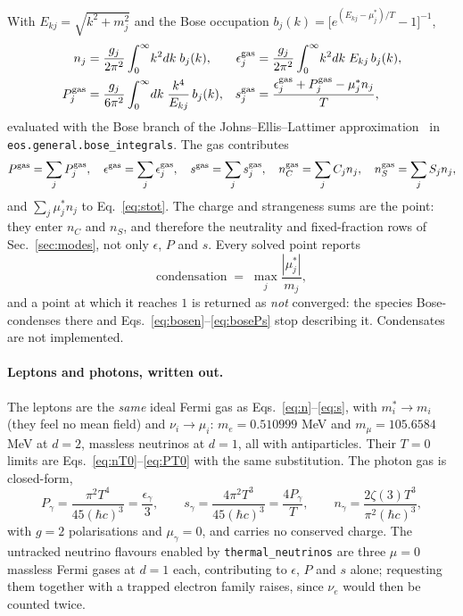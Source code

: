 \documentclass[aps,prc,onecolumn,superscriptaddress,nofootinbib,10pt]{revtex4-2}
\newcommand{\nC}{n_C}
\newcommand{\nS}{n_S}
\newcommand{\meff}[1]{m^{*}_{#1}}
\begin{document}
With $E_{kj} = \sqrt{k^2 + m_j^2}$ and the Bose occupation
$b_j(k) = \big[e^{(E_{kj} - \mu^*_j)/T} - 1\big]^{-1}$,
\begin{align}
  n_j &= \frac{g_j}{2\pi^2}\int_0^\infty \! k^2 dk\; b_j(k) ,
  &
  \epsilon^{\rm gas}_j &= \frac{g_j}{2\pi^2}\int_0^\infty \! k^2 dk\;
                          E_{kj}\, b_j(k) ,
  \label{eq:bosen} \\
  P^{\rm gas}_j &= \frac{g_j}{6\pi^2}\int_0^\infty \! dk\;
                   \frac{k^4}{E_{kj}}\, b_j(k) ,
  &
  s^{\rm gas}_j &= \frac{\epsilon^{\rm gas}_j + P^{\rm gas}_j
                          - \mu^*_j n_j}{T} ,
  \label{eq:bosePs}
\end{align}
evaluated with the Bose branch of the Johns--Ellis--Lattimer
approximation~\cite{JohnsEllisLattimer1996} in
\texttt{eos.general.bose\_integrals}. The gas contributes
\begin{equation}
  P^{\rm gas} = \sum_j P^{\rm gas}_j , \quad
  \epsilon^{\rm gas} = \sum_j \epsilon^{\rm gas}_j , \quad
  s^{\rm gas} = \sum_j s^{\rm gas}_j , \quad
  n_C^{\rm gas} = \sum_j C_j n_j , \quad
  n_S^{\rm gas} = \sum_j S_j n_j ,
\end{equation}
and $\sum_j \mu^*_j n_j$ to Eq.~\eqref{eq:stot}. The charge and strangeness
sums are the point: they enter $\nC$ and $\nS$, and therefore the neutrality
and fixed-fraction rows of Sec.~\ref{sec:modes}, not only $\epsilon$, $P$ and
$s$. Every solved point reports
\begin{equation}
  \text{condensation} \;=\; \max_j \frac{|\mu^*_j|}{m_j} ,
\end{equation}
and a point at which it reaches $1$ is returned as \emph{not} converged:
the species Bose-condenses there and Eqs.~\eqref{eq:bosen}--\eqref{eq:bosePs}
stop describing it. Condensates are not implemented.

\paragraph{Leptons and photons, written out.} The leptons are the \emph{same}
ideal Fermi gas as Eqs.~\eqref{eq:n}--\eqref{eq:s}, with $\meff{i} \to m_i$
(they feel no mean field) and $\nu_i \to \mu_i$: $m_e = 0.510999$ MeV and
$m_\mu = 105.6584$ MeV at $d = 2$, massless neutrinos at $d = 1$, all with
antiparticles. Their $T = 0$ limits are Eqs.~\eqref{eq:nT0}--\eqref{eq:PT0}
with the same substitution. The photon gas is closed-form,
\begin{equation}
  P_\gamma = \frac{\pi^2 T^4}{45 (\hbar c)^3} = \frac{\epsilon_\gamma}{3} ,
  \qquad
  s_\gamma = \frac{4\pi^2 T^3}{45 (\hbar c)^3} = \frac{4 P_\gamma}{T} ,
  \qquad
  n_\gamma = \frac{2\zeta(3) T^3}{\pi^2 (\hbar c)^3} ,
\end{equation}
with $g = 2$ polarisations and $\mu_\gamma = 0$, and carries no conserved
charge. The untracked neutrino flavours enabled by
\texttt{thermal\_neutrinos} are three $\mu = 0$ massless Fermi gases at
$d = 1$ each, contributing to $\epsilon$, $P$ and $s$ alone; requesting them
together with a trapped electron family raises, since $\nu_e$ would then be
counted twice.
\end{document}
